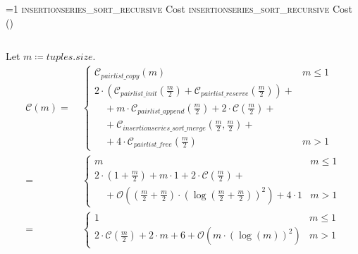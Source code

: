 \setcounter{insertionseriessortrecursivecostcounter}{1}
\newcommand{\insertionseriessortrecursivecostframe}{%
    \ifnum\value{insertionseriessortrecursivecostcounter}=1
        \textsc{insertionseries\_sort\_recursive} Cost%
    \else
        \textsc{insertionseries\_sort\_recursive} Cost (\theinsertionseriessortrecursivecostcounter)%
    \fi
}
        \begin{frame}{\insertionseriessortrecursivecostframe}
            \begin{columns}[c]
                \begin{column}{0.7\textwidth}
                    \footnotesize
                    Let $m \coloneqq tuples.size$.
                    \begin{align*}
                        \mathcal{C}{\left(m\right)} = & \; \begin{cases}
                            \mathcal{C}_{pairlist\_copy}{\left(m\right)} & m \leq 1 \\
                            2 \cdot \left(\mathcal{C}_{pairlist\_init}{\left(\frac{m}{2}\right)} + \mathcal{C}_{pairlist\_reserve}{\left(\frac{m}{2}\right)}\right) + \\
                            \quad + m \cdot \mathcal{C}_{pairlist\_append}{\left(\frac{m}{2}\right)} + 2 \cdot \mathcal{C}{\left(\frac{m}{2}\right)} + \\
                            \quad + \mathcal{C}_{insertionseries\_sort\_merge}{\left(\frac{m}{2}, \frac{m}{2}\right)} + \\
                            \quad + 4 \cdot \mathcal{C}_{pairlist\_free}{\left(\frac{m}{2}\right)} & m > 1
                        \end{cases}
                        \\
                        = & \; \begin{cases}
                            m & m \leq 1 \\
                            2 \cdot \left(1 + \frac{m}{2}\right) + m \cdot 1 + 2 \cdot \mathcal{C}{\left(\frac{m}{2}\right)} + \\
                            \quad + \mathcal{O}{\left(\left(\frac{m}{2} + \frac{m}{2}\right) \cdot \left(\log{\left(\frac{m}{2} + \frac{m}{2}\right)}\right)^2 \right)} + 4 \cdot 1 & m > 1
                        \end{cases}
                        \\
                        = & \; \begin{cases}
                            1 & m \leq 1 \\
                            2 \cdot \mathcal{C}{\left(\frac{m}{2}\right)} + 2 \cdot m + 6 + \mathcal{O}{\left(m \cdot \left(\log{\left(m\right)}\right)^2\right)} & m > 1
                        \end{cases}
                    \end{align*}
                \end{column}


\end{columns}
\end{frame}
